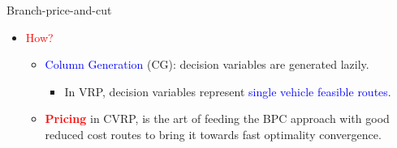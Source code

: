 \begin{frame}{Branch-price-and-cut}
	\begin{itemize}[<+->]
		\item \textcolor{red}{How?}
		      \begin{itemize}
			      \item \textcolor{blue}{Column Generation} (CG): decision variables are generated lazily.
			            \begin{itemize}
				            \item In VRP, decision variables represent \textcolor{blue}{single vehicle feasible routes}.
			            \end{itemize}
			      \item \textcolor{red}{\textbf{Pricing}} in CVRP, is the art of feeding the BPC approach with good reduced cost routes to bring it towards fast optimality convergence.
		      \end{itemize}
	\end{itemize}
\end{frame}


